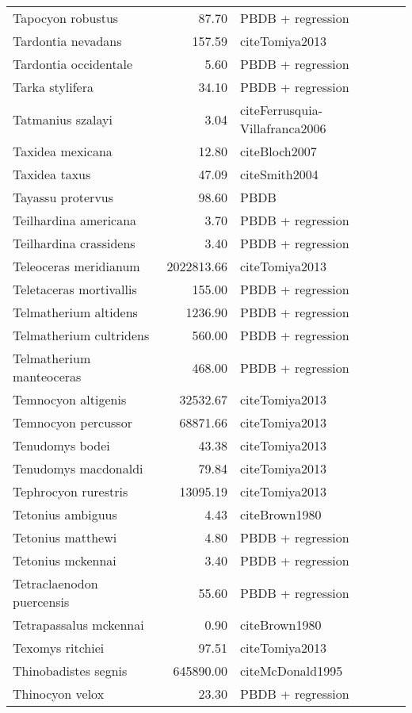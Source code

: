 \begin{table}[ht]
\begin{tabular}{lrl}
  Tapocyon robustus & 87.70 & PBDB + regression \\ 
  Tardontia nevadans & 157.59 & cite{Tomiya2013} \\ 
  Tardontia occidentale & 5.60 & PBDB + regression \\ 
  Tarka stylifera & 34.10 & PBDB + regression \\ 
  Tatmanius szalayi & 3.04 & cite{Ferrusquia-Villafranca2006} \\ 
  Taxidea mexicana & 12.80 & cite{Bloch2007} \\ 
  Taxidea taxus & 47.09 & cite{Smith2004} \\ 
  Tayassu protervus & 98.60 & PBDB \\ 
  Teilhardina americana & 3.70 & PBDB + regression \\ 
  Teilhardina crassidens & 3.40 & PBDB + regression \\ 
  Teleoceras meridianum & 2022813.66 & cite{Tomiya2013} \\ 
  Teletaceras mortivallis & 155.00 & PBDB + regression \\ 
  Telmatherium altidens & 1236.90 & PBDB + regression \\ 
  Telmatherium cultridens & 560.00 & PBDB + regression \\ 
  Telmatherium manteoceras & 468.00 & PBDB + regression \\ 
  Temnocyon altigenis & 32532.67 & cite{Tomiya2013} \\ 
  Temnocyon percussor & 68871.66 & cite{Tomiya2013} \\ 
  Tenudomys bodei & 43.38 & cite{Tomiya2013} \\ 
  Tenudomys macdonaldi & 79.84 & cite{Tomiya2013} \\ 
  Tephrocyon rurestris & 13095.19 & cite{Tomiya2013} \\ 
  Tetonius ambiguus & 4.43 & cite{Brown1980} \\ 
  Tetonius matthewi & 4.80 & PBDB + regression \\ 
  Tetonius mckennai & 3.40 & PBDB + regression \\ 
  Tetraclaenodon puercensis & 55.60 & PBDB + regression \\ 
  Tetrapassalus mckennai & 0.90 & cite{Brown1980} \\ 
  Texomys ritchiei & 97.51 & cite{Tomiya2013} \\ 
  Thinobadistes segnis & 645890.00 & cite{McDonald1995} \\ 
  Thinocyon velox & 23.30 & PBDB + regression \\ 

\end{tabular}
\end{table}
